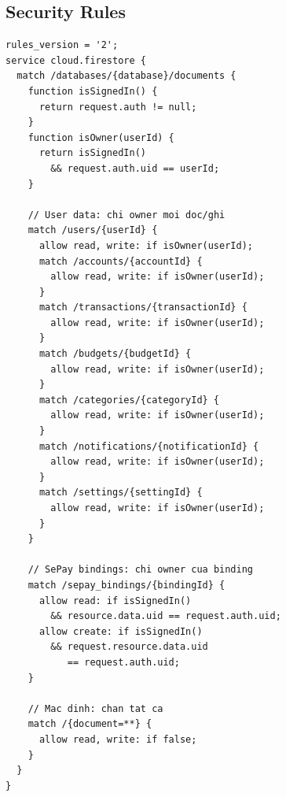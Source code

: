 \subsection{Security Rules}

\begin{lstlisting}[style=rulesStyle, caption={Firestore Security Rules --- G13 Money}]
rules_version = '2';
service cloud.firestore {
  match /databases/{database}/documents {
    function isSignedIn() {
      return request.auth != null;
    }
    function isOwner(userId) {
      return isSignedIn()
        && request.auth.uid == userId;
    }

    // User data: chi owner moi doc/ghi
    match /users/{userId} {
      allow read, write: if isOwner(userId);
      match /accounts/{accountId} {
        allow read, write: if isOwner(userId);
      }
      match /transactions/{transactionId} {
        allow read, write: if isOwner(userId);
      }
      match /budgets/{budgetId} {
        allow read, write: if isOwner(userId);
      }
      match /categories/{categoryId} {
        allow read, write: if isOwner(userId);
      }
      match /notifications/{notificationId} {
        allow read, write: if isOwner(userId);
      }
      match /settings/{settingId} {
        allow read, write: if isOwner(userId);
      }
    }

    // SePay bindings: chi owner cua binding
    match /sepay_bindings/{bindingId} {
      allow read: if isSignedIn()
        && resource.data.uid == request.auth.uid;
      allow create: if isSignedIn()
        && request.resource.data.uid
           == request.auth.uid;
    }

    // Mac dinh: chan tat ca
    match /{document=**} {
      allow read, write: if false;
    }
  }
}
\end{lstlisting}
